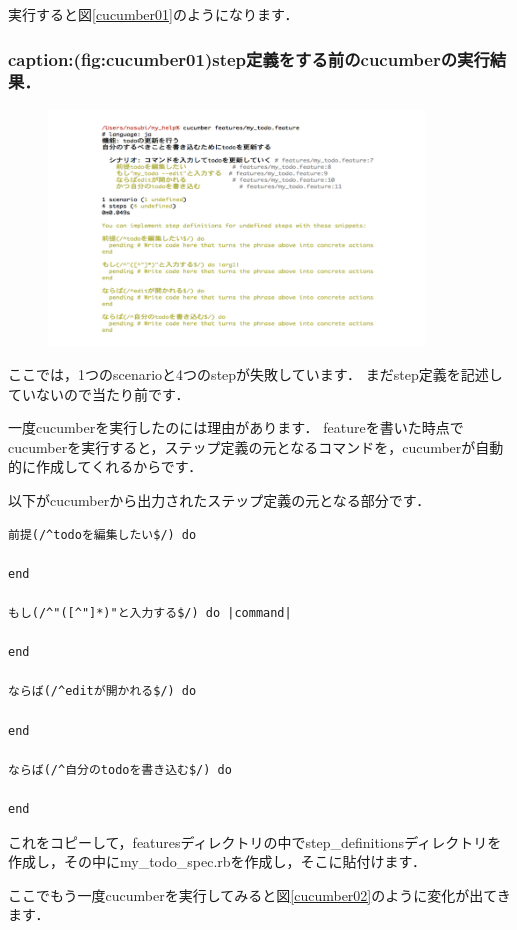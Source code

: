 実行すると図\ref{cucumber01}のようになります．

\subsubsection{caption:(fig:cucumber01)step定義をする前のcucumberの実行結果．}
\begin{figure}[htbp]\begin{center}
\includegraphics[width=10cm,bb= 0 0 737 553]{../figs/./cucumber01.001.jpg}
\caption{}
\label{default}\end{center}\end{figure}
ここでは，1つのscenarioと4つのstepが失敗しています．
まだstep定義を記述していないので当たり前です．

一度cucumberを実行したのには理由があります．
featureを書いた時点でcucumberを実行すると，ステップ定義の元となるコマンドを，cucumberが自動的に作成してくれるからです．

以下がcucumberから出力されたステップ定義の元となる部分です．
\begin{lstlisting}[style=customCsh]
前提(/^todoを編集したい$/) do

end

もし(/^"([^"]*)"と入力する$/) do |command|

end

ならば(/^editが開かれる$/) do
  
end

ならば(/^自分のtodoを書き込む$/) do

end
\end{lstlisting}
これをコピーして，featuresディレクトリの中でstep\_definitionsディレクトリを作成し，その中にmy\_todo\_spec.rbを作成し，そこに貼付けます．

ここでもう一度cucumberを実行してみると図\ref{cucumber02}のように変化が出てきます．

